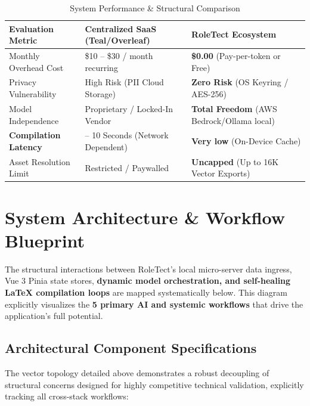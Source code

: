 \documentclass[10pt,a4paper]{article}
\begin{document}
\begin{table}[h]
\centering
\caption{System Performance \& Structural Comparison}
\vspace{2mm}
\begin{tabularx}{\textwidth}{>{\raggedright\arraybackslash}p{}>{\raggedright\arraybackslash}X>{\raggedright\arraybackslash}X}
\toprule
\textbf{Evaluation Metric} & \textbf{Centralized SaaS (Teal/Overleaf)} & \textbf{RoleTect Ecosystem} \\
\midrule
Monthly Overhead Cost & \$10 -- \$30 / month recurring & \textbf{\$0.00} (Pay-per-token or Free) \\
Privacy Vulnerability & High Risk (PII Cloud Storage) & \textbf{Zero Risk} (OS Keyring / AES-256) \\
Model Independence & Proprietary / Locked-In Vendor & \textbf{Total Freedom} (AWS Bedrock/Ollama local) \\
\textbf{Compilation Latency} & 1 -- 10 Seconds (Network Dependent) & \textbf{Very low} (On-Device Cache) \\
Asset Resolution Limit & Restricted / Paywalled & \textbf{Uncapped} (Up to 16K Vector Exports) \\
\bottomrule
\end{tabularx}
\end{table}

    \vspace{30mm}



\section{System Architecture \& Workflow Blueprint}
The structural interactions between RoleTect's local micro-server data ingress, Vue 3 Pinia state stores, \textbf{dynamic model orchestration, and self-healing LaTeX compilation loops} are mapped systematically below. This diagram explicitly visualizes the \textbf{5 primary AI and systemic workflows} that drive the application's full potential.

\subsection{Architectural Component Specifications}
The vector topology detailed above demonstrates a robust decoupling of structural concerns designed for highly competitive technical validation, explicitly tracking all cross-stack workflows:
\end{document}
